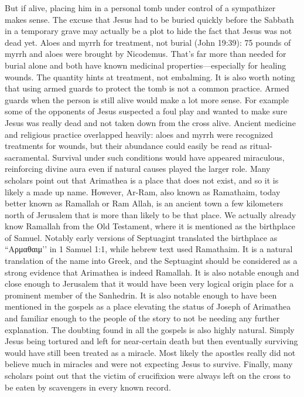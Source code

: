 But if alive, placing him in a personal tomb under control of a sympathizer makes sense.
The excuse that Jesus had to be buried quickly before the Sabbath in a temporary grave may actually be a plot to hide the fact that Jesus was not dead yet.
Aloes and myrrh for treatment, not burial (John 19:39): 75 pounds of myrrh and aloes were brought by Nicodemus.
That’s far more than needed for burial alone and both have known medicinal properties—especially for healing wounds.
The quantity hints at treatment, not embalming.
It is also worth noting that using armed guards to protect the tomb is not a common practice.
Armed guards when the person is still alive would make a lot more sense.
For example some of the opponents of Jesus suspected a foul play and wanted to make sure Jesus was really dead and not taken down from the cross alive.
Ancient medicine and religious practice overlapped heavily: aloes and myrrh were recognized treatments for wounds, but their abundance could easily be read as ritual-sacramental. Survival under such conditions would have appeared miraculous, reinforcing divine aura even if natural causes played the larger role.
Many scholars point out that Arimathea is a place that does not exist, and so it is likely a made up name.
However, Ar-Ram, also known as Ramathaim, today better known as Ramallah or Ram Allah, is an ancient town a few kilometers north of Jerusalem that is more than likely to be that place.
We actually already know Ramallah from the Old Testament, where it is mentioned as the birthplace of Samuel.
Notably early versions of Septuagint translated the birthplace as ``Αρμαθαιμ’’ in 1 Samuel 1:1, while hebrew text used Ramathaim.
It is a natural translation of the name into Greek, and the Septuagint should be considered as a strong evidence that Arimathea is indeed Ramallah.
It is also notable enough and close enough to Jerusalem that it would have been very logical origin place for a prominent member of the Sanhedrin.
It is also notable enough to have been mentioned in the gospels as a place elevating the status of Joseph of Arimathea and familiar enough to the people of the story to not be needing any further explanation.
The doubting found in all the gospels is also highly natural.
Simply Jesus being tortured and left for near-certain death but then eventually surviving would have still been treated as a miracle.
Most likely the apostles really did not believe much in miracles and were not expecting Jesus to survive.
Finally, many scholars point out that the victim of crucifixion were always left on the cross to be eaten by scavengers in every known record.
